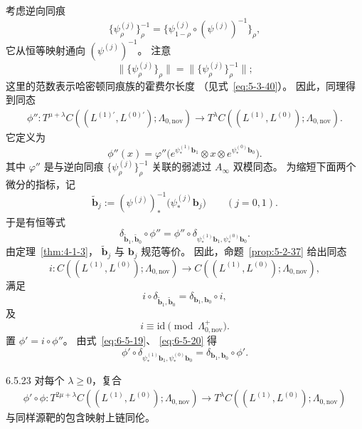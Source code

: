 考虑逆向同痕
\[
\{\psi_\rho^{(j)}\}_\rho^{-1}
=\{\psi_{1-\rho}^{(j)}
\circ(\psi^{(j)})^{-1}\}_\rho,
\]
它从恒等映射通向
$(\psi^{(j)})^{-1}$。
注意
\[
\bigl\|\{\psi_\rho^{(j)}\}_\rho\bigr\|
=\bigl\|\{\psi_\rho^{(j)}\}_\rho^{-1}\bigr\|;
\]
这里的范数表示哈密顿同痕族的霍费尔长度
（见式~\eqref{eq:5-3-40}）。
因此，同理得到同态
\begin{equation}
\begin{aligned}
\phi'':T^{\mu+\lambda}
C((L^{(1)\prime},L^{(0)\prime});
\Lambda_{0,\mathrm{nov}})
\longrightarrow
T^\lambda
C((L^{(1)},L^{(0)});\Lambda_{0,\mathrm{nov}}).
\end{aligned}
\tag{6.5.17}\label{eq:6-5-17}
\end{equation}
它定义为
\begin{equation}
\phi''(x)=\varphi''
\bigl(e^{\psi_*^{(1)}\mathbf b_1}
\otimes x\otimes
e^{\psi_*^{(0)}\mathbf b_0}\bigr).
\tag{6.5.18}\label{eq:6-5-18}
\end{equation}
其中 $\varphi''$ 是与逆向同痕
$\{\psi_\rho^{(j)}\}_\rho^{-1}$
关联的弱滤过 $A_\infty$ 双模同态。
为缩短下面两个微分的指标，记
\[
\widetilde{\mathbf b}_j
:=(\psi^{(j)})^{-1}_*
\bigl(\psi_*^{(j)}\mathbf b_j\bigr)
\qquad(j=0,1).
\]
于是有恒等式
\begin{equation}
\delta_{\widetilde{\mathbf b}_1,
\widetilde{\mathbf b}_0}\circ\phi''
=\phi''\circ
\delta_{\psi_*^{(1)}\mathbf b_1,
\psi_*^{(0)}\mathbf b_0}.
\tag{6.5.19}\label{eq:6-5-19}
\end{equation}
由定理~\ref{thm:4-1-3}，
$\widetilde{\mathbf b}_j$
与 $\mathbf b_j$ 规范等价。
因此，命题~\ref{prop:5-2-37}
给出同态
\[
i:C((L^{(1)},L^{(0)});
\Lambda_{0,\mathrm{nov}})
\longrightarrow
C((L^{(1)},L^{(0)});
\Lambda_{0,\mathrm{nov}}),
\]
满足
\begin{equation}
i\circ\delta_{\widetilde{\mathbf b}_1,
\widetilde{\mathbf b}_0}
=\delta_{\mathbf b_1,\mathbf b_0}\circ i,
\tag{6.5.20}\label{eq:6-5-20}
\end{equation}
及
\begin{equation}
i\equiv\mathrm{id}
\pmod{\Lambda_{0,\mathrm{nov}}^+}.
\tag{6.5.21}\label{eq:6-5-21}
\end{equation}
置 $\phi'=i\circ\phi''$。
由式~\eqref{eq:6-5-19}、
\eqref{eq:6-5-20} 得
\begin{equation}
\phi'\circ
\delta_{\psi_*^{(1)}\mathbf b_1,
\psi_*^{(0)}\mathbf b_0}
=\delta_{\mathbf b_1,\mathbf b_0}
\circ\phi'.
\tag{6.5.22}\label{eq:6-5-22}
\end{equation}

\begin{lemma}{6.5.23}\label{lem:6-5-23}
对每个 $\lambda\ge0$，复合
\[
\begin{aligned}
\phi'\circ\phi:
T^{2\mu+\lambda}
C((L^{(1)},L^{(0)});\Lambda_{0,\mathrm{nov}})
\longrightarrow
T^\lambda
C((L^{(1)},L^{(0)});\Lambda_{0,\mathrm{nov}})
\end{aligned}
\]
与同样源靶的包含映射上链同伦。
\end{lemma}

